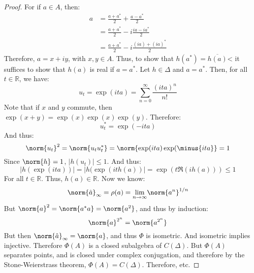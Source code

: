    \begin{proof}
        For if $a\in{A}$, then:
        \begin{align}
            a&=\frac{a+a^{*}}{2}+\frac{a-a^{*}}{2}\\
             &=\frac{a+a^{*}}{2}-i\frac{ia-ia^{*}}{2}\\
             &=\frac{a+a^{*}}{2}-i\frac{(ia)+(ia)^{*}}{2}
        \end{align}
        Therefore, $a=x+iy$, with $x,y\in{A}$. Thus, to show
        that $h(a^{*})=\overline{h(a)}$< it suffices to show that
        $h(a)$ is real if $a=a^{*}$. Let $h\in\Delta$ and
        $a=a^{*}$. Then, for all $t\in\mathbb{R}$, we have:
        \begin{equation}
            u_{t}=\exp(ita)=\sum_{n=0}^{\infty}
                \frac{(ita)^{n}}{n!}
        \end{equation}
        Note that if $x$ and $y$ commute, then
        $\exp(x+y)=\exp(x)\exp(x)\exp(y)$. Therefore:
        \begin{equation}
            u_{t}^{*}=\exp(\minus{i}ta)
        \end{equation}
        And thus:
        \begin{equation}
            \norm{u_{t}}^{2}=\norm{u_{t}u_{t}^{*}}
            =\norm{\exp(ita)\exp(\minus{ita}}=1
        \end{equation}
        Since $\norm{h}=1$, $|h(u_{t})|\leq{1}$. And thus:
        \begin{equation}
            |h(\exp(ita))|=|h(\exp(ith(a))|
                =\exp(t\Re(ih(a)))\leq{1}
        \end{equation}
        For all $t\in\mathbb{R}$. Thus, $h(a)\in\mathbb{R}$.
        Now we know:
        \begin{equation}
            \norm{\hat{a}}_{\infty}=\rho(a)
                =\underset{n\rightarrow\infty}{\lim}
                    \norm{a^{n}}^{1/n}
        \end{equation}
        But $\norm{a}^{2}=\norm{a^{*}a}=\norm{a^{2}}$, and thus
        by induction:
        \begin{equation}
            \norm{a}^{2^{n}}=\norm{a^{2^{n}}}
        \end{equation}
        But then $\norm{\hat{a}}_{\infty}=\norm{a}$, and thus
        $\Phi$ is isometric. And isometric implies injective.
        Therefore $\Phi(A)$ is a closed subalgebra of
        $C(\Delta)$. But $\Phi(A)$ separates points, and is closed
        under complex conjugation, and therefore by the
        Stone-Weierstrass theorem, $\Phi(A)=C(\Delta)$.
        Therefore, etc.
    \end{proof}
